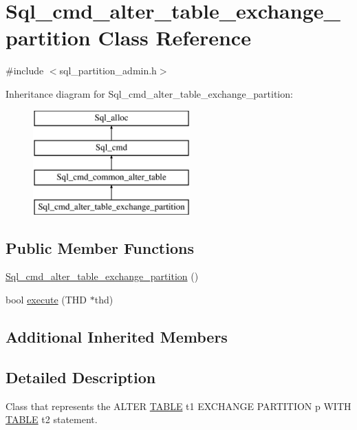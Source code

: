 \hypertarget{classSql__cmd__alter__table__exchange__partition}{}\section{Sql\+\_\+cmd\+\_\+alter\+\_\+table\+\_\+exchange\+\_\+partition Class Reference}
\label{classSql__cmd__alter__table__exchange__partition}


{\ttfamily \#include $<$sql\+\_\+partition\+\_\+admin.\+h$>$}

Inheritance diagram for Sql\+\_\+cmd\+\_\+alter\+\_\+table\+\_\+exchange\+\_\+partition\+:\begin{figure}[H]
\begin{center}
\leavevmode
\includegraphics[height=4.000000cm]{classSql__cmd__alter__table__exchange__partition}
\end{center}
\end{figure}
\subsection*{Public Member Functions}
\begin{DoxyCompactItemize}
\item 
\mbox{\hyperlink{classSql__cmd__alter__table__exchange__partition_ae5faf9ac28292341d038dc5c31ab9835}{Sql\+\_\+cmd\+\_\+alter\+\_\+table\+\_\+exchange\+\_\+partition}} ()
\item 
bool \mbox{\hyperlink{classSql__cmd__alter__table__exchange__partition_a4fe65ee03e6db3c42a6c6db1475bbf09}{execute}} (T\+HD $\ast$thd)
\end{DoxyCompactItemize}
\subsection*{Additional Inherited Members}


\subsection{Detailed Description}
Class that represents the A\+L\+T\+ER \mbox{\hyperlink{structTABLE}{T\+A\+B\+LE}} t1 E\+X\+C\+H\+A\+N\+GE P\+A\+R\+T\+I\+T\+I\+ON p W\+I\+TH \mbox{\hyperlink{structTABLE}{T\+A\+B\+LE}} t2 statement. 

